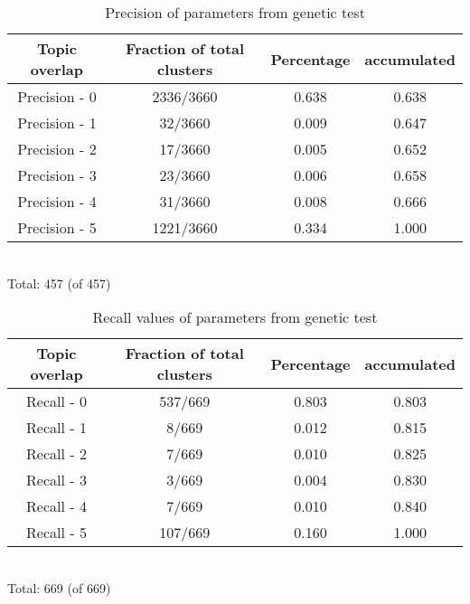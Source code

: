 \begin{table}
\begin{center}
\begin{tabular}{|c|c|c|c|}
\hline
Topic overlap &  Fraction of total clusters & Percentage  & accumulated\\ 
\hline
Precision - 0&   2336/3660& 0.638&   0.638\\ 
Precision - 1&   32/3660&   0.009&   0.647\\ 
Precision - 2&   17/3660&   0.005&   0.652\\ 
Precision - 3&   23/3660&   0.006&   0.658\\ 
Precision - 4&   31/3660&   0.008&   0.666\\ 
Precision - 5&   1221/3660& 0.334&   1.000\\ 

\hline
\end{tabular}
\\Total: 457 (of  457)
\end{center}
\caption{Precision of parameters from genetic test}
\label{tab:geneticparametersprecision}
\end{table}


\begin{table}
\begin{center}
\begin{tabular}{|c|c|c|c|}
\hline
Topic overlap &  Fraction of total clusters & Percentage  & accumulated\\ 
\hline
Recall - 0&    537/669&   0.803&   0.803\\ 
Recall - 1&     8/669&    0.012&   0.815\\ 
Recall - 2&     7/669&    0.010&   0.825\\ 
Recall - 3&     3/669&    0.004&   0.830\\ 
Recall - 4&     7/669&    0.010&   0.840\\ 
Recall - 5&    107/669&   0.160&   1.000\\ 
\hline
\end{tabular}
\\Total: 669 (of  669)
\end{center}
\caption{Recall values of parameters from genetic test}
\label{tab:geneticparametersrecall}
\end{table}

